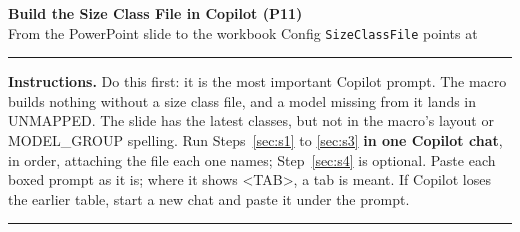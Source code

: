 \documentclass[11pt]{article}
\begin{document}
\begin{center}
  {\large\bfseries Build the Size Class File in Copilot (P11)}\\[0.25em]
  {\small From the PowerPoint slide to the workbook Config \texttt{SizeClassFile} points at}
\end{center}

\vspace{-0.7em}
\noindent\rule{\linewidth}{0.8pt}

{\footnotesize\textbf{Instructions.} Do this first: it is the most important Copilot prompt. The macro builds nothing without a size class file, and a model missing from it lands in UNMAPPED. The slide has the latest classes, but not in the macro's layout or MODEL\_GROUP spelling. Run Steps~\ref{sec:s1} to \ref{sec:s3} \textbf{in one Copilot chat}, in order, attaching the file each one names; Step~\ref{sec:s4} is optional. Paste each boxed prompt as it is; where it shows <TAB>, a tab is meant. If Copilot loses the earlier table, start a new chat and paste it under the prompt.\par}

\vspace{-0.1em}
\noindent\rule{\linewidth}{0.4pt}
\end{document}
